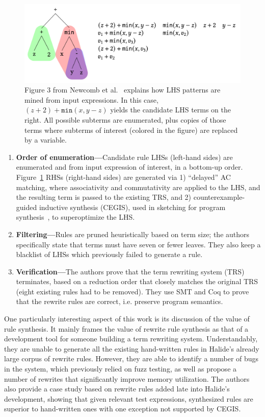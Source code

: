 \documentclass[acmsmall,screen,nonacm]{acmart}
\begin{document}
\begin{figure}[htbp]
\centering
\includegraphics[scale=0.5,trim=0cm 0cm 0cm 0cm, clip]{figs/halide_bottomup.png}
\caption{Figure 3 from Newcomb et al.~\cite{newcomb2020verifyinghalide} explains how LHS patterns are mined from input expressions. In this case, $(z+2)+\texttt{min}(x,y-z)$ yields the candidate LHS terms on the right. All possible subterms are enumerated, plus copies of those terms where subterms of interest (colored in the figure) are replaced by a variable.}
\label{fig:halide_bottomup}
\end{figure}

\begin{enumerate}
    \item \textbf{Order of enumeration---}Candidate rule LHSs (left-hand sides) are enumerated and from input expression of interest, in a bottom-up order. Figure~\ref{fig:halide_bottomup} RHSs (right-hand sides) are generated via 1) “delayed” AC matching, where associativity and commutativity are applied to the LHS, and the resulting term is passed to the existing TRS, and 2) counterexample-guided inductive synthesis (CEGIS), used in sketching for program synthesis~\cite{solar2009sketching}, to superoptimize the LHS. 
    \item \textbf{Filtering---}Rules are pruned heuristically based on term size; the authors specifically state that terms must have seven or fewer leaves. They also keep a blacklist of LHSs which previously failed to generate a rule.
    \item \textbf{Verification---}The authors prove that the term rewriting system (TRS) terminates, based on a reduction order that closely matches the original TRS (eight existing rules had to be removed). They use SMT and Coq to prove that the rewrite rules are correct, i.e. preserve program semantics.
\end{enumerate}

One particularly interesting aspect of this work is its discussion of the value of rule synthesis. It mainly frames the value of rewrite rule synthesis as that of a development tool for someone building a term rewriting system. Understandably, they are unable to generate all the existing hand-written rules in Halide's already large corpus of rewrite rules. However, they are able to identify a number of bugs in the system, which previously relied on fuzz testing, as well as propose a number of rewrites that significantly improve memory utilization. The authors also provide a case study based on rewrite rules added late into Halide's development, showing that given relevant test expressions, synthesized rules are superior to hand-written ones with one exception not supported by CEGIS.
\end{document}
